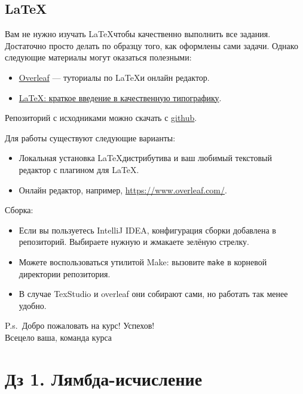 \documentclass{article}
\begin{document}
    \subsection*{\LaTeX}

    Вам не нужно изучать \LaTeX чтобы качественно выполнить все задания.
    Достаточно просто делать по образцу того, как оформлены сами задачи.
    Однако следующие материалы могут оказаться полезными:

    \begin{itemize}
        \item \href{https://www.overleaf.com/learn}{Overleaf} --- туториалы по \LaTeX и онлайн редактор.
        \item \href{https://youtu.be/NOslSvJs29I}{LaTeX: краткое введение в качественную типографику}.
    \end{itemize}

    Репозиторий с исходниками можно скачать с \href{https://github.com/fpcourse-materials/lambda-hws}{github}.

    Для работы существуют следующие варианты:
    \begin{itemize}
        \item Локальная установка \LaTeX дистрибутива и ваш любимый текстовый редактор с плагином для \LaTeX.
        \item Онлайн редактор, например, \url{https://www.overleaf.com/}.
    \end{itemize}

    Сборка:
    \begin{itemize}
        \item Если вы пользуетесь IntelliJ IDEA, конфигурация сборки добавлена в репозиторий.
        Выбираете нужную и жмакаете зелёную стрелку.
        \item Можете воспользоваться утилитой Make: вызовите \texttt{make} в корневой директории репозитория.
        \item В случае TexStudio и overleaf они собирают сами, но работать так менее удобно.
    \end{itemize}

    \begin{flushright}
        P.s.\ Добро пожаловать на курс!
        Успехов! \\
        Всецело ваша, команда курса
    \end{flushright}

    \newpage


    \section*{Дз 1. Лямбда-исчисление}
\end{document}
